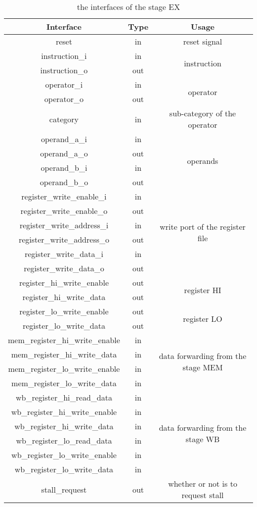 \begin{table}[!h]
\centering
\begin{tabular}{ccc}
\toprule
Interface & Type & Usage \\ \midrule
reset & in & reset signal \\ \hline
instruction\_i & in & \multirow{2}{*}{instruction} \\ \cline{1-2}
instruction\_o & out &  \\ \hline
operator\_i & in & \multirow{2}{*}{operator} \\ \cline{1-2}
operator\_o & out &  \\ \hline
category & in & sub-category of the operator \\ \hline
operand\_a\_i & in & \multirow{4}{*}{operands} \\ \cline{1-2}
operand\_a\_o & out &  \\ \cline{1-2}
operand\_b\_i & in &  \\ \cline{1-2}
operand\_b\_o & out &  \\ \hline
register\_write\_enable\_i & in & \multirow{6}{*}{write port of the register file} \\ \cline{1-2}
register\_write\_enable\_o & out &  \\ \cline{1-2}
register\_write\_address\_i & in &  \\ \cline{1-2}
register\_write\_address\_o & out &  \\ \cline{1-2}
register\_write\_data\_i & in &  \\ \cline{1-2}
register\_write\_data\_o & out &  \\ \hline
register\_hi\_write\_enable & out & \multirow{2}{*}{register HI} \\ \cline{1-2}
register\_hi\_write\_data & out &  \\ \hline
register\_lo\_write\_enable & out & \multirow{2}{*}{register LO} \\ \cline{1-2}
register\_lo\_write\_data & out &  \\ \hline
mem\_register\_hi\_write\_enable & in & \multirow{4}{*}{data forwarding from the stage MEM} \\ \cline{1-2}
mem\_register\_hi\_write\_data & in &  \\ \cline{1-2}
mem\_register\_lo\_write\_enable & in &  \\ \cline{1-2}
mem\_register\_lo\_write\_data & in &  \\ \hline
wb\_register\_hi\_read\_data & in & \multirow{6}{*}{data forwarding from the stage WB} \\ \cline{1-2}
wb\_register\_hi\_write\_enable & in &  \\ \cline{1-2}
wb\_register\_hi\_write\_data & in &  \\ \cline{1-2}
wb\_register\_lo\_read\_data & in &  \\ \cline{1-2}
wb\_register\_lo\_write\_enable & in &  \\ \cline{1-2}
wb\_register\_lo\_write\_data & in &  \\ \hline
stall\_request & out & whether or not is to request stall \\ \bottomrule\end{tabular}
\caption{the interfaces of the stage EX}
\end{table}